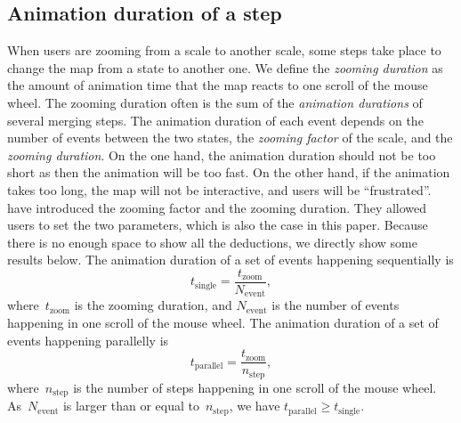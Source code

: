 \documentclass{ica}
\begin{document}


\subsection{Animation duration of a step}
\label{sec:zooming_duration}

When users are zooming from a scale to another scale,
some steps take place to change the map from a state to another one.
We define the \emph{zooming duration} as the amount of 
animation time that the map reacts to one scroll of the mouse wheel.
The zooming duration often is the sum of 
the \emph{animation durations} of several merging steps.
The animation duration of each event depends on 
the number of events between the two states,
the \emph{zooming factor} of the scale, and 
the \emph{zooming duration}.
On the one hand, the animation duration should not be too short 
as then the animation will be too fast. 
On the other hand, if the animation takes too long, 
the map will not be interactive, and users will be ``frustrated''.
\citet[][]{Meijers2020Web} 
have introduced the zooming factor and the zooming duration.
They allowed users to set the two parameters,
which is also the case in this paper.
Because there is no enough space to show all the deductions,
we directly show some results below.
The animation duration of a set of events happening sequentially is
\begin{equation*}
\label{eq:t_single}
t_\mathrm{single} = \frac{t_\mathrm{zoom}}{N_\mathrm{event}},
\end{equation*}
where~$t_\mathrm{zoom}$ is the zooming duration, 
and $N_\mathrm{event}$ is the number of events
happening in one scroll of the mouse wheel.
The animation duration of a set of events happening parallelly is
\begin{equation*}
\label{eq:t_parallel}
t_\mathrm{parallel} = \frac{t_\mathrm{zoom}}{n_\mathrm{step}},
\end{equation*}
where~$n_\mathrm{step}$ is the number of steps
happening in one scroll of the mouse wheel.
As~$N_\mathrm{event}$ is larger than or equal to~$n_\mathrm{step}$,
we have $t_\mathrm{parallel} \ge t_\mathrm{single}$.
\end{document}
